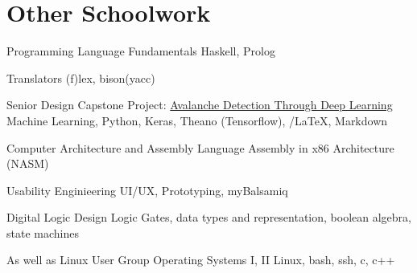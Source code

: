 \documentclass{tccv}
\begin{document}
\section{Other Schoolwork}
	\begin{yearlist}
		\item {} %
			{Programming Language Fundamentals}
			{Haskell, Prolog}

		\item {} %
			{Translators}
			{(f)lex, bison(yacc)}

		\item [Senior Design] {} %
			{Capstone Project: \href{http://web.engr.oregonstate.edu/~parkj6/capstone/final_poster.pdf} {Avalanche Detection Through Deep Learning}}
			{Machine Learning, Python, Keras, Theano (Tensorflow), /LaTeX, Markdown}

		\item {} %
			{Computer Architecture and Assembly Language}
			{Assembly in x86 Architecture (NASM)}

		\item {} %
			{Usability Enginieering}
			{UI/UX, Prototyping, myBalsamiq}

		\item {} %
			{Digital Logic Design}
			{Logic Gates, data types and representation, boolean algebra, state machines}
			
		\item [As well as Linux User Group] {} %
			{Operating Systems I, II}
			{Linux, bash, ssh, c, c++}

	\end{yearlist}



\newpage
\end{document}
